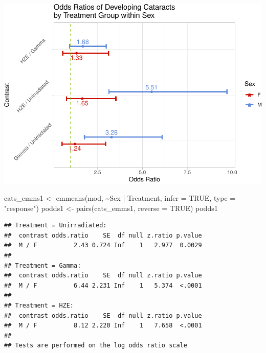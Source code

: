 \documentclass[
]{article}
\newenvironment{Shaded}{\begin{snugshade}}{\end{snugshade}}
\newcommand{\AttributeTok}[1]{\textcolor[rgb]{0.77,0.63,0.00}{#1}}
\newcommand{\ConstantTok}[1]{\textcolor[rgb]{0.00,0.00,0.00}{#1}}
\newcommand{\FunctionTok}[1]{\textcolor[rgb]{0.00,0.00,0.00}{#1}}
\newcommand{\NormalTok}[1]{#1}
\newcommand{\OtherTok}[1]{\textcolor[rgb]{0.56,0.35,0.01}{#1}}
\newcommand{\SpecialCharTok}[1]{\textcolor[rgb]{0.00,0.00,0.00}{#1}}
\newcommand{\StringTok}[1]{\textcolor[rgb]{0.31,0.60,0.02}{#1}}
\begin{document}
\includegraphics{final_report_files/figure-latex/oddsr-1.pdf}

\begin{Shaded}
\begin{Highlighting}[]
\NormalTok{cats\_emms1 }\OtherTok{\textless{}{-}} \FunctionTok{emmeans}\NormalTok{(mod, }\SpecialCharTok{\textasciitilde{}}\NormalTok{Sex }\SpecialCharTok{|}\NormalTok{ Treatment, }\AttributeTok{infer =} \ConstantTok{TRUE}\NormalTok{, }\AttributeTok{type =} \StringTok{"response"}\NormalTok{)}
\NormalTok{podds1 }\OtherTok{\textless{}{-}} \FunctionTok{pairs}\NormalTok{(cats\_emms1, }\AttributeTok{reverse =} \ConstantTok{TRUE}\NormalTok{)}
\NormalTok{podds1}
\end{Highlighting}
\end{Shaded}

\begin{verbatim}
## Treatment = Unirradiated:
##  contrast odds.ratio    SE  df null z.ratio p.value
##  M / F          2.43 0.724 Inf    1   2.977  0.0029
## 
## Treatment = Gamma:
##  contrast odds.ratio    SE  df null z.ratio p.value
##  M / F          6.44 2.231 Inf    1   5.374  <.0001
## 
## Treatment = HZE:
##  contrast odds.ratio    SE  df null z.ratio p.value
##  M / F          8.12 2.220 Inf    1   7.658  <.0001
## 
## Tests are performed on the log odds ratio scale
\end{verbatim}
\end{document}
